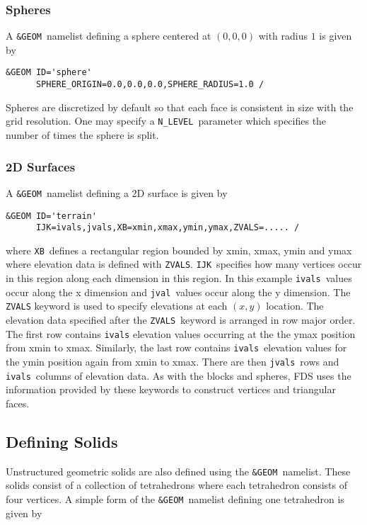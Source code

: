 \documentclass[12pt]{article}
\begin{document}
\subsubsection{Spheres}
A {\tt \&GEOM}\ namelist defining a sphere centered at $(0,0,0)$ with radius $1$ is given by

\begin{verbatim}
&GEOM ID='sphere'
      SPHERE_ORIGIN=0.0,0.0,0.0,SPHERE_RADIUS=1.0 /
\end{verbatim}

\noindent Spheres are discretized by default so that each face is consistent in size with the grid resolution.
One may specify a {\tt N\_LEVEL}\ parameter which specifies the number of times the sphere is split.

\subsubsection{2D Surfaces}
A {\tt \&GEOM}\ namelist defining a 2D surface is given by

\begin{verbatim}
&GEOM ID='terrain'
      IJK=ivals,jvals,XB=xmin,xmax,ymin,ymax,ZVALS=..... /
\end{verbatim}

\noindent where {\tt XB}\ defines a rectangular region bounded by xmin, xmax, ymin and ymax where elevation data is defined with {\tt ZVALS}.
{\tt IJK}\ specifies how many vertices occur in this region along each dimension in this region.
In this example {\tt ivals}\ values occur along the x dimension and {\tt jval}\ values occur along the y dimension.
The {\tt ZVALS} keyword is used to specify elevations at each $(x,y)$ location.
The elevation data specified after the {\tt ZVALS}\ keyword is arranged in row major order.
The first row contains {\tt ivals} elevation values occurring at the the ymax position from xmin to xmax.
Similarly, the last row contains
{\tt ivals}\ elevation values for the ymin position again from xmin to xmax.
There are then {\tt jvals}\ rows and {\tt ivals}\ columns of elevation data.
As with the blocks and spheres, FDS uses the information
provided by these keywords to construct
vertices and triangular faces.

\subsection{Defining Solids}
Unstructured geometric solids are also defined using the {\tt \&GEOM}\ namelist.
These solids consist of a collection of tetrahedrons where each tetrahedron consists of four vertices.
A simple form of the {\tt \&GEOM}\ namelist defining one tetrahedron is given by
\end{document}
